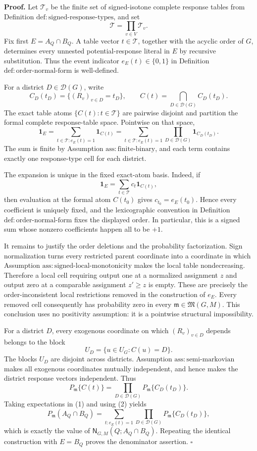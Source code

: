 \textbf{Proof.}
Let \(\mathcal T_v\) be the finite set of signed-isotone complete response tables from Definition \(\mathrm{def:signed\text{-}response\text{-}types}\), and set
\[
 \mathcal T=\prod_{v\in V}\mathcal T_v.
\]
Fix first \(E=A_Q\cap B_Q\).  A table vector \(t\in\mathcal T\), together with the acyclic order of \(G\), determines every unnested potential-response literal in \(E\) by recursive substitution.  Thus the event indicator \(e_E(t)\in\{0,1\}\) in Definition \(\mathrm{def:order\text{-}normal\text{-}form}\) is well-defined.

For a district \(D\in\mathcal D(G)\), write
\[
 C_D(t_D)=\{(R_v)_{v\in D}=t_D\},
 \qquad
 C(t)=\bigcap_{D\in\mathcal D(G)}C_D(t_D).
\]
The exact table atoms \(\{C(t):t\in\mathcal T\}\) are pairwise disjoint and partition the formal complete response-table space.  Pointwise on that space,
\[
 \mathbf 1_E
 =\sum_{t\in\mathcal T:e_E(t)=1}\mathbf 1_{C(t)}
 =\sum_{t\in\mathcal T:e_E(t)=1}
   \prod_{D\in\mathcal D(G)}\mathbf 1_{C_D(t_D)}.
\tag{1}
\]
The sum is finite by Assumption \(\mathrm{ass:finite\text{-}binary}\), and each term contains exactly one response-type cell for each district.

The expansion is unique in the fixed exact-atom basis.  Indeed, if
\[
 \mathbf 1_E=\sum_{t\in\mathcal T}c_t\mathbf 1_{C(t)},
\]
then evaluation at the formal atom \(C(t_0)\) gives \(c_{t_0}=e_E(t_0)\).  Hence every coefficient is uniquely fixed, and the lexicographic convention in Definition \(\mathrm{def:order\text{-}normal\text{-}form}\) fixes the displayed order.  In particular, this is a signed sum whose nonzero coefficients happen all to be \(+1\).

It remains to justify the order deletions and the probability factorization.  Sign normalization turns every restricted parent coordinate into a coordinate in which Assumption \(\mathrm{ass:signed\text{-}local\text{-}monotonicity}\) makes the local table nondecreasing.  Therefore a local cell requiring output one at a normalized assignment \(z\) and output zero at a comparable assignment \(z'\ge z\) is empty.  These are precisely the order-inconsistent local restrictions removed in the construction of \(e_E\).  Every removed cell consequently has probability zero in every \(\mathfrak m\in\mathfrak M(G,M)\).  This conclusion uses no positivity assumption: it is a pointwise structural impossibility.

For a district \(D\), every exogenous coordinate on which \((R_v)_{v\in D}\) depends belongs to the block
\[
 U_D=\{u\in U_G:C(u)=D\}.
\]
The blocks \(U_D\) are disjoint across districts.  Assumption \(\mathrm{ass:semi\text{-}markovian}\) makes all exogenous coordinates mutually independent, and hence makes the district response vectors independent.  Thus
\[
 P_{\mathfrak m}\{C(t)\}
 =\prod_{D\in\mathcal D(G)}P_{\mathfrak m}\{C_D(t_D)\}.
\tag{2}
\]
Taking expectations in (1) and using (2) yields
\[
 P_{\mathfrak m}(A_Q\cap B_Q)
 =\sum_{t:e_E(t)=1}
   \prod_{D\in\mathcal D(G)}P_{\mathfrak m}\{C_D(t_D)\},
\]
which is exactly the value of \(\mathsf N_{G,M}(Q;A_Q\cap B_Q)\).  Repeating the identical construction with \(E=B_Q\) proves the denominator assertion. \(\square\)